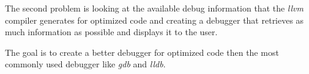 The second problem is looking at the available debug information that the \emph{llvm} compiler generates for optimized code and creating a debugger that retrieves as much information as possible and displays it to the user.


The goal is to create a better debugger for optimized code then the most commonly used debugger like \emph{gdb} and \emph{lldb}.

